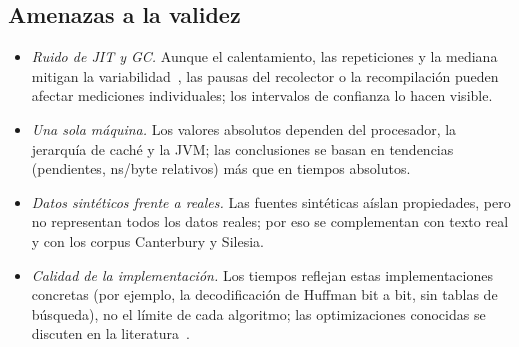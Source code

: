 \subsection{Amenazas a la validez}
\label{sec:amenazas}
\begin{itemize}
  \item \emph{Ruido de JIT y GC.} Aunque el calentamiento, las repeticiones y la mediana mitigan
        la variabilidad~\cite{georges2007}, las pausas del recolector o la recompilación pueden
        afectar mediciones individuales; los intervalos de confianza lo hacen visible.
  \item \emph{Una sola máquina.} Los valores absolutos dependen del procesador, la jerarquía de
        caché y la JVM; las conclusiones se basan en tendencias (pendientes, ns/byte relativos)
        más que en tiempos absolutos.
  \item \emph{Datos sintéticos frente a reales.} Las fuentes sintéticas aíslan propiedades,
        pero no representan todos los datos reales; por eso se complementan con texto real y
        con los corpus Canterbury y Silesia.
  \item \emph{Calidad de la implementación.} Los tiempos reflejan estas implementaciones
        concretas (por ejemplo, la decodificación de Huffman bit a bit, sin tablas de búsqueda),
        no el límite de cada algoritmo; las optimizaciones conocidas se discuten en la
        literatura~\cite{moffat1997,moffat2019}.
\end{itemize}
